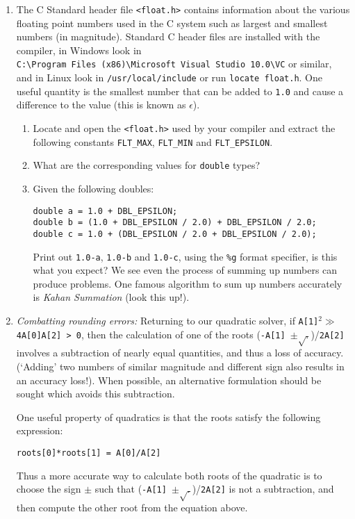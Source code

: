 \documentclass[a4paper,12pt]{article}
\begin{document}
\begin{enumerate}
\item The C Standard header file {\tt <float.h>} contains information about the various floating point numbers used in the C system such as largest and smallest numbers (in magnitude). Standard C header files are installed with the compiler, in Windows look in \\\verb|C:\Program Files (x86)\Microsoft Visual Studio 10.0\VC| or similar, and in Linux look in \verb|/usr/local/include| or run \verb|locate float.h|. One useful quantity is the smallest number that can be added to {\tt 1.0} and cause a difference to the value (this is known as $\epsilon$).
\begin{enumerate}
\item Locate and open the {\tt <float.h>} used by your compiler and extract the following constants {\tt FLT\_MAX}, {\tt FLT\_MIN} and {\tt FLT\_EPSILON}.
\item What are the corresponding values for {\tt double} types?
\item Given the following doubles:
\begin{verbatim}
double a = 1.0 + DBL_EPSILON;
double b = (1.0 + DBL_EPSILON / 2.0) + DBL_EPSILON / 2.0;
double c = 1.0 + (DBL_EPSILON / 2.0 + DBL_EPSILON / 2.0);
\end{verbatim}
Print out {\tt 1.0-a}, {\tt 1.0-b} and {\tt 1.0-c}, using the \verb|%g| format specifier, is this what you expect? We see even the process of summing up numbers can produce problems. One famous algorithm to sum up numbers accurately is \emph{Kahan Summation} (look this up!).
\end{enumerate}

\item \emph{Combatting rounding errors:} Returning to our quadratic solver, if {\tt A[1]$^2 \gg$ 4A[0]A[2] > 0}, then the calculation of one of the roots ({\tt -A[1] $\pm \sqrt{.}$})/{\tt 2A[2]} involves a subtraction of nearly equal quantities, and thus a loss of accuracy. (`Adding' two numbers of similar magnitude and different sign also results in an accuracy loss!). When possible, an alternative formulation should be sought which avoids this subtraction.

One useful property of quadratics is that the roots satisfy the following expression:
\begin{center}
\tt roots[0]*roots[1] = A[0]/A[2]
\end{center}
Thus a more accurate way to calculate both roots of the quadratic is to choose the sign $\pm$ such that ({\tt -A[1] $\pm \sqrt{.}$})/{\tt 2A[2]} is not a subtraction, and then compute the other root from the equation above.


\end{enumerate}
\end{document}
